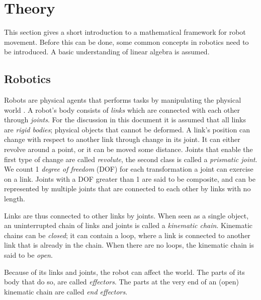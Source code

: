 \section{Theory}
\label{theory}

This section gives a short introduction to a mathematical framework for robot movement.  Before this can be done, some common concepts in robotics need to be introduced.  A basic understanding of linear algebra is assumed.


\subsection{Robotics}
\label{theory/robotics}
Robots are physical agents that performs tasks by manipulating the physical world \cite[p.901]{Russel2003}.  A robot's body consists of \emph{links} which are connected with each other through \emph{joints}.  For the discussion in this document it is assumed that all links are \emph{rigid bodies}; physical objects that cannot be deformed.  A link's position can change with respect to another link through change in its joint.  It can either revolve around a point, or it can be moved some distance.  Joints that enable the first type of change are called \emph{revolute}, the second class is called a \emph{prismatic joint}.  We count 1 \emph{degree of freedom} (DOF) for each transformation a joint can exercise on a link.  Joints with a DOF greater than 1 are said to be composite, and can be represented by multiple joints that are connected to each other by links with no length.  

Links are thus connected to other links by joints.  When seen as a single object, an uninterrupted chain of links and joints is called a \emph{kinematic chain}.  Kinematic chains can be \emph{closed}; it can contain a loop, where a link is connected to another link that is already in the chain.  When there are no loops, the kinematic chain is said to be \emph{open}.

Because of its links and joints, the robot can affect the world.  The parts of its body that do so, are called \emph{effectors}.  The parts at the very end of an (open) kinematic chain are called \emph{end effectors}.


